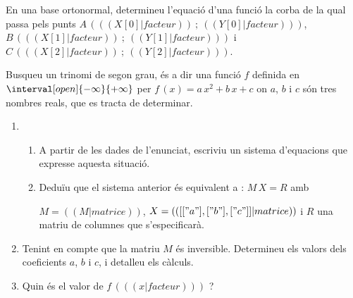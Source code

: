 \exercice
En una base ortonormal, determineu l'equació d'una funció la corba de la qual passa pels punts
$A\,( (( X[0]|facteur )) ~;~ (( Y[0]|facteur )) )$,
$B\,( (( X[1]|facteur )) ~;~ (( Y[1]|facteur )) )$ i
$C\,( (( X[2]|facteur )) ~;~ (( Y[2]|facteur )) )$.

Busqueu un trinomi de segon grau, és a dir una funció $f$ definida en $\interval[open]{-\infty}{+\infty}$ per
 \mbox{$f\,(x) = a\,x^2 + b\,x + c$} on $a$, $b$ i $c$ són tres nombres reals, que es tracta de determinar.

  \begin{enumerate}
    \item 
      \begin{enumerate}
        \item A partir de les dades de l'enunciat, escriviu un sistema d'equacions que expresse aquesta situació.
        \item Deduïu que el sistema anterior és equivalent a : $M\,X = R$ amb

          $M = (( M|matrice ))$, $X= (( [["a"], ["b"], ["c"]]|matrice ))$ i $R$ una matriu de columnes que s'especificarà.
      \end{enumerate}
  \end{enumerate}
  \begin{enumerate}
      \setcounter{enumi}{1}
    \item Tenint en compte que la matriu $M$ és inversible.
      Determineu els valors dels coeficients $a$, $b$ i $c$, i detalleu els càlculs.
    \item  Quin és el valor de $f\,( (( x|facteur )) )$ ?

  \end{enumerate}
